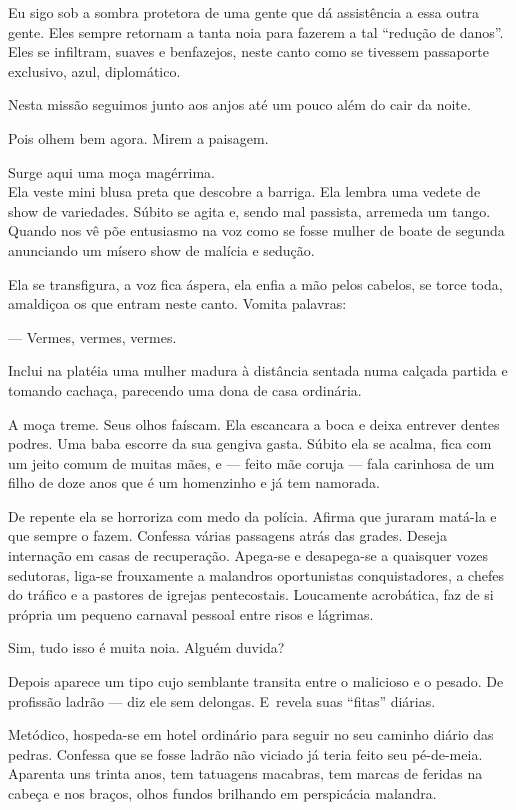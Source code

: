 Eu sigo sob a sombra protetora de uma gente que dá assistência a essa
outra gente. Eles sempre retornam a tanta noia para fazerem a tal
``redução de danos''. Eles se infiltram, suaves e benfazejos, neste
canto como se tivessem passaporte exclusivo, azul, diplomático.

Nesta missão seguimos junto aos anjos até um pouco além do cair da
noite.

\asterisc{}

Pois olhem bem agora. Mirem a paisagem.

Surge aqui uma moça magérrima.\\ Ela veste mini blusa preta que descobre
a barriga. Ela lembra uma vedete de show de variedades. Súbito se agita
e, sendo mal passista, arremeda um tango. Quando nos vê põe entusiasmo
na voz como se fosse mulher de boate de segunda anunciando um mísero
show de malícia e sedução.

Ela se transfigura, a voz fica áspera, ela enfia a mão pelos cabelos, se
torce toda, amaldiçoa os que entram neste canto. Vomita palavras:

— Vermes, vermes, vermes.

Inclui na platéia uma mulher madura à distância sentada numa calçada
partida e tomando cachaça, parecendo uma dona de casa ordinária.

A moça treme. Seus olhos faíscam. Ela escancara a boca e deixa entrever
dentes podres. Uma baba escorre da sua gengiva gasta. Súbito ela se
acalma, fica com um jeito comum de muitas mães, e --- feito mãe coruja
--- fala carinhosa de um filho de doze anos que é um homenzinho e já tem
namorada.

De repente ela se horroriza com medo da polícia. Afirma que juraram
matá-la e que sempre o fazem. Confessa várias passagens atrás das
grades. Deseja internação em casas de recuperação. Apega-se e
desapega-se a quaisquer vozes sedutoras, liga-se frouxamente a malandros
oportunistas conquistadores, a chefes do tráfico e a pastores de igrejas
pentecostais. Loucamente acrobática, faz de si própria um pequeno
carnaval pessoal entre risos e lágrimas.

Sim, tudo isso é muita noia. Alguém duvida?

\asterisc{}

Depois aparece um tipo cujo semblante transita entre o malicioso e o
pesado. De profissão ladrão --- diz ele sem delongas. E~revela suas
``fitas'' diárias.

Metódico, hospeda-se em hotel ordinário para seguir no seu caminho
diário das pedras. Confessa que se fosse ladrão não viciado já teria
feito seu pé-de-meia. Aparenta uns trinta anos, tem tatuagens macabras,
tem marcas de feridas na cabeça e nos braços, olhos fundos brilhando em
perspicácia malandra.

